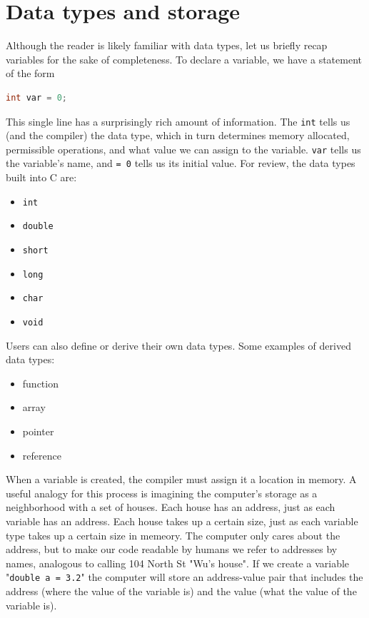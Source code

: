\documentclass[nobib]{tufte-handout}
\begin{document}
\section{Data types and storage}
Although the reader is likely familiar with data types, let us 
briefly recap variables for the sake of completeness. To declare a 
variable, we have a statement of the form 
\begin{lstlisting}[language=C,caption=Variable]
   int var = 0;
\end{lstlisting}
This single line has a surprisingly rich amount of information.
The \texttt{int} tells us (and the compiler) the data type, which
in turn determines memory allocated, permissible operations, 
and what value we can assign to the variable.
\texttt{var} tells us the variable's name, and \texttt{= 0} tells us its
initial value. For review, the data types built into C are:
\begin{itemize}
   \item \texttt{int}
   \item \texttt{double}
   \item \texttt{short}
   \item \texttt{long}
   \item \texttt{char}
   \item \texttt{void}
\end{itemize}
Users can also define or derive their own data types. Some examples
of derived data types:
\begin{itemize}
   \item function
   \item array
   \item pointer
   \item reference
\end{itemize}
When a variable is created, the compiler must assign it a 
location in memory. A useful analogy for this process is 
imagining the computer's storage as a neighborhood with a 
set of houses. Each house has an address, just as each variable 
has an address. Each house takes
up a certain size, just as each variable type takes up a certain 
size in memeory. The computer only cares about the address, but
to make our code readable by humans we refer to addresses by names, 
analogous to calling 104 North St "Wu's house". If we create a variable 
"\texttt{double a = 3.2}" the computer will store an address-value pair that includes
the address (where the value of the variable is) and the value (what the value
of the variable is).
\end{document}
